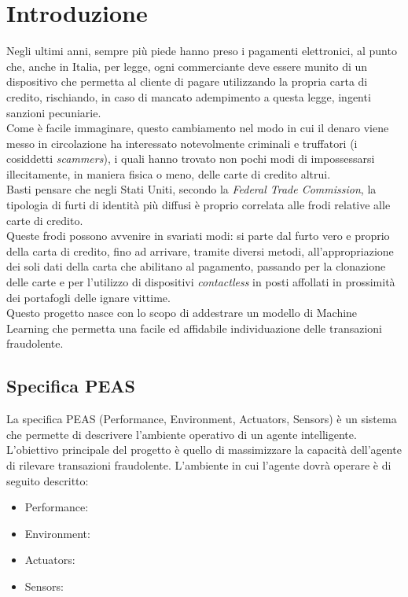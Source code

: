 \documentclass[]{article}
\begin{document}
\section{Introduzione}
    Negli ultimi anni, sempre più piede hanno preso i pagamenti elettronici, al punto che, anche in Italia, per legge, ogni commerciante deve essere munito di un dispositivo che permetta al cliente di pagare utilizzando la propria carta di credito, rischiando, in caso di mancato adempimento a questa legge, ingenti sanzioni pecuniarie.\\

    Come è facile immaginare, questo cambiamento nel modo in cui il denaro viene messo in circolazione ha interessato notevolmente criminali e truffatori (i cosiddetti \textit{scammers}), i quali hanno trovato non pochi modi di impossessarsi illecitamente, in maniera fisica o meno, delle carte di credito altrui.\\

    Basti pensare che negli Stati Uniti, secondo la \textit{Federal Trade Commission}, la tipologia di furti di identità più diffusi è proprio correlata alle frodi relative alle carte di credito.\\
    Queste frodi possono avvenire in svariati modi: si parte dal furto vero e proprio della carta di credito, fino ad arrivare, tramite diversi metodi, all'appropriazione dei soli dati della carta che abilitano al pagamento, passando per la clonazione delle carte e per l'utilizzo di dispositivi \textit{contactless} in posti affollati in prossimità dei portafogli delle ignare vittime.\\

    Questo progetto nasce con lo scopo di addestrare un modello di Machine Learning che permetta una facile ed affidabile individuazione delle transazioni fraudolente.

    \subsection{Specifica PEAS}
        La specifica PEAS (Performance, Environment, Actuators, Sensors) è un sistema che permette di descrivere l'ambiente operativo di un agente intelligente. L'obiettivo principale del progetto è quello di massimizzare la capacità dell'agente di rilevare transazioni fraudolente. L'ambiente in cui l'agente dovrà operare è di seguito descritto:
        \begin{itemize}
            \item Performance:
            \item Environment:
            \item Actuators:
            \item Sensors:
        \end{itemize}
\end{document}
